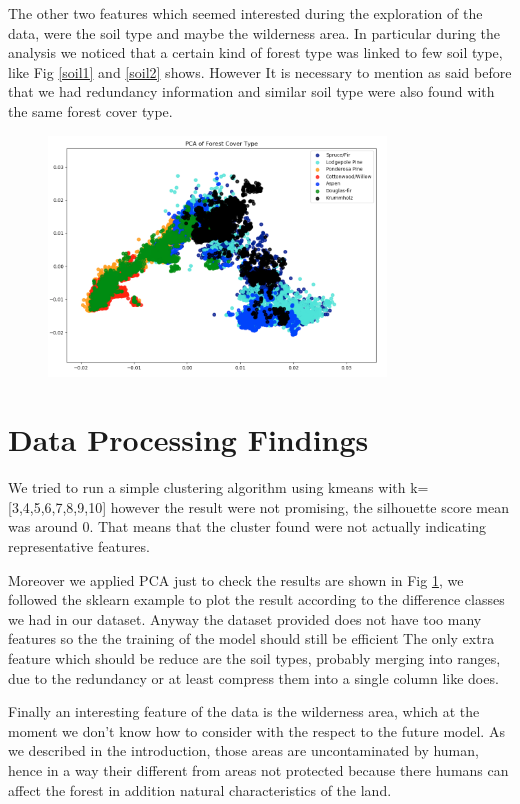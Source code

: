 \documentclass[a4paper, 11pt]{article}
\begin{document}
The other two features which seemed interested during the exploration of the data, were the soil type and maybe the wilderness area. In particular during the analysis we noticed that a certain kind of forest type was linked to few soil type, like Fig \ref{soil1} and \ref{soil2} shows. However It is necessary to mention as said before that we had redundancy information and similar soil type were also found with the same forest cover type. 

\begin{figure}[htb]
\centering
  \includegraphics[width=0.8\textwidth]{img/pca}
  \label{pca}
\end{figure}

\section*{Data Processing Findings}
We tried to run a simple clustering algorithm using kmeans with k= [3,4,5,6,7,8,9,10] however the result were not promising, the silhouette score mean was around 0. That means that the cluster found were not actually indicating representative features.

Moreover we applied PCA just to check the results are shown in Fig \ref{pca}, we followed the sklearn example to plot the result according to the difference classes we had in our dataset. Anyway the dataset provided does not have too many features so the the training of the model should still be efficient The only extra feature which should be reduce are the soil types, probably merging into ranges, due to the redundancy or at least compress them into a single column like \cite{skill} does.

Finally an interesting feature of the data is the wilderness area, which at the moment we don't know how to consider with the respect to the future model. As we described in the introduction, those areas are uncontaminated by human, hence in a way their different from areas not protected because there humans can affect the forest in addition natural characteristics of the land.
\end{document}
